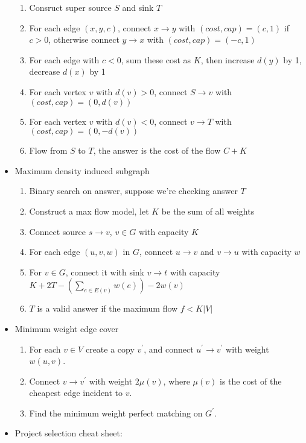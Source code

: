 \begin{itemize}
\begin{enumerate}
        \item Consruct super source $S$ and sink $T$
        \item For each edge $(x, y, c)$, connect $x \rightarrow y$ with $(cost, cap) = (c, 1)$ if $c > 0$, otherwise connect $y \rightarrow x$ with $(cost, cap) = (-c, 1)$
        \item For each edge with $c < 0$, sum these cost as $K$, then increase $d(y)$ by 1, decrease $d(x)$ by 1
        \item For each vertex $v$ with $d(v) > 0$, connect $S \rightarrow v$ with $(cost, cap) = (0, d(v))$
        \item For each vertex $v$ with $d(v) < 0$, connect $v \rightarrow T$ with $(cost, cap) = (0, -d(v))$
        \item Flow from $S$ to $T$, the answer is the cost of the flow $C + K$
      \end{enumerate}
    \item Maximum density induced subgraph
      \begin{enumerate}
        \item Binary search on answer, suppose we're checking answer $T$
        \item Construct a max flow model, let $K$ be the sum of all weights
        \item Connect source $s \rightarrow v$, $v \in G$ with capacity $K$
        \item For each edge $(u, v, w)$ in $G$, connect $u \rightarrow v$ and $v \rightarrow u$ with capacity $w$
        \item For $v \in G$, connect it with sink $v \rightarrow t$ with capacity $K + 2T - \left(\sum_{e \in E(v)}{w(e)}\right) - 2w(v)$
        \item $T$ is a valid answer if the maximum flow $f < K \lvert V \rvert$
      \end{enumerate}
    \item Minimum weight edge cover
      \begin{enumerate}
        \item For each $v \in V$ create a copy $v^\prime$, and connect $u^\prime \to v^\prime$ with weight $w(u, v)$.
        \item Connect $v \to v^\prime$ with weight $2\mu(v)$, where $\mu(v)$ is the cost of the cheapest edge incident to $v$.
        \item Find the minimum weight perfect matching on $G^\prime$.
      \end{enumerate}
    \item Project selection cheat sheet:

\end{itemize}
